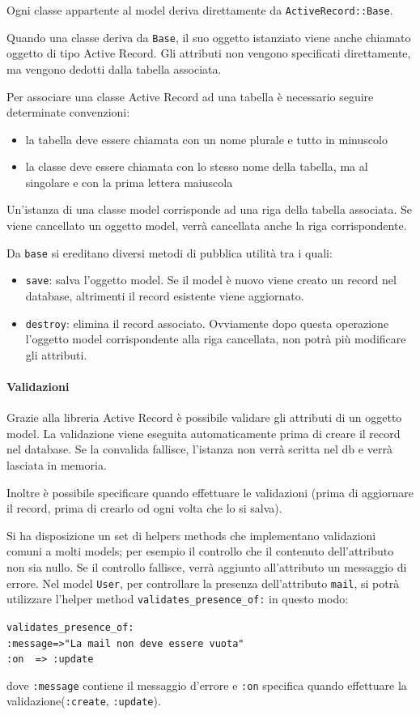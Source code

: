\documentclass[11pt,a4paper]{article}
\begin{document}
Ogni classe appartente al model deriva direttamente da \verb|ActiveRecord::Base|.


Quando una classe deriva da \verb|Base|, il suo oggetto istanziato viene anche chiamato oggetto di tipo Active Record.
Gli attributi non vengono specificati direttamente, ma vengono dedotti dalla tabella associata.


Per associare una classe Active Record ad una tabella è necessario seguire determinate convenzioni:
\begin{itemize}
 \item la tabella deve essere chiamata con un nome plurale e tutto in minuscolo
 \item la classe deve essere chiamata con lo stesso nome della tabella, ma al singolare e con la prima lettera maiuscola
\end{itemize}


Un'istanza di una classe model corrisponde ad una riga della tabella associata.
Se viene cancellato un oggetto model, verrà cancellata anche la riga corrispondente.


Da \verb|base| si ereditano diversi metodi di pubblica utilità tra i quali:
\begin{itemize}
 \item \verb|save|: salva l'oggetto model. Se il model è nuovo viene creato un record nel database, altrimenti il record esistente viene aggiornato.
 \item \verb|destroy|: elimina il record associato. Ovviamente dopo questa operazione l'oggetto model corrispondente alla riga cancellata, non potrà più modificare gli attributi.
\end{itemize}
\paragraph{Validazioni}
Grazie alla libreria Active Record è possibile validare gli attributi di un oggetto model. La validazione viene eseguita automaticamente prima di creare il record nel database. Se la convalida fallisce, l'istanza non verrà scritta nel db e verrà lasciata in memoria.


Inoltre è possibile specificare quando effettuare le validazioni (prima di aggiornare il record, prima di crearlo od ogni volta che lo si salva).


Si ha disposizione un set di helpers methods che implementano validazioni comuni a molti models; per esempio il controllo che il contenuto dell'attributo non sia nullo.
Se il controllo fallisce, verrà aggiunto all'attributo un messaggio di errore.
Nel model \verb|User|, per controllare la presenza dell'attributo \verb|mail|, si potrà utilizzare l'helper method \verb|validates_presence_of:| in questo modo:\\
\begin{center}
 \verb|validates_presence_of:|\\
 \verb|:message=>"La mail non deve essere vuota"|\\
 \verb|:on  => :update|\\
\end{center}
dove \verb|:message| contiene il messaggio d'errore e \verb|:on| specifica quando effettuare la validazione(\verb|:create|, \verb|:update|).
\end{document}
